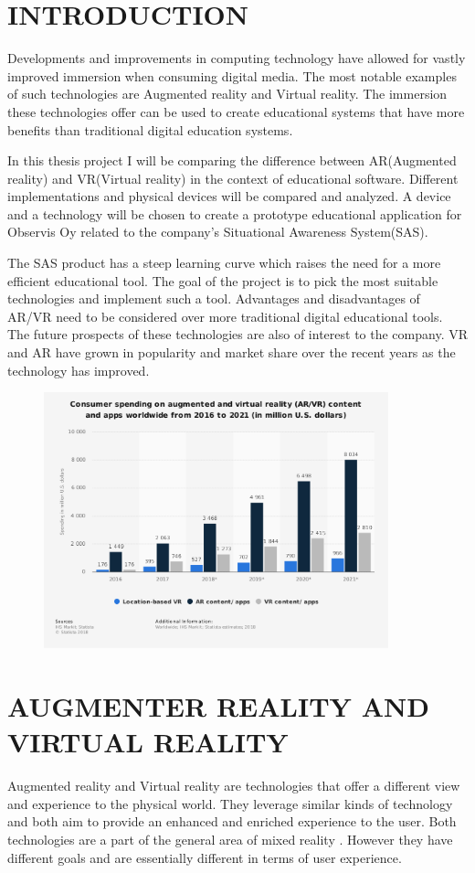 \documentclass[12pt, a4paper,oneside, nocenter]{thesis}
\begin{document}
\chapter{\MakeUppercase{Introduction}}
Developments and improvements in computing technology have allowed for vastly improved immersion when consuming digital media. The most notable examples of such technologies are Augmented reality and Virtual reality. The immersion these technologies offer can be used to create educational systems that have more benefits than traditional digital education systems. \par
In this thesis project I will be comparing the difference between AR(Augmented reality) and VR(Virtual reality) in the context of educational software. Different implementations and physical devices will be compared and analyzed. A device and a technology will be chosen to create a prototype educational application for Observis Oy related to the company's Situational Awareness System(SAS).\par The SAS product has a steep learning curve which raises the need for a more efficient educational tool. The goal of the project is to pick the most suitable technologies and implement such a tool. Advantages and disadvantages of AR/VR need to be considered over more traditional digital educational tools. The future prospects of these technologies are also of interest to the company. VR and AR have grown in popularity and market share over the recent years as the technology has improved.
\begin{figure}[H]
	\centering
	\includegraphics[height=210pt]{ar-vr-consumer-spending}
	\caption{\citep{ar-vr-chart}}
	\label{fig:ar-vr-consumer-spending}
\end{figure}
\chapter{\MakeUppercase{Augmenter Reality and Virtual Reality}}
Augmented reality and Virtual reality are technologies that offer a different view and experience to the physical world. They leverage similar kinds of technology and both aim to provide an enhanced and enriched experience to the user. Both technologies are a part of the general area of mixed reality . However they have different goals and are essentially different in terms of user experience.
\end{document}
